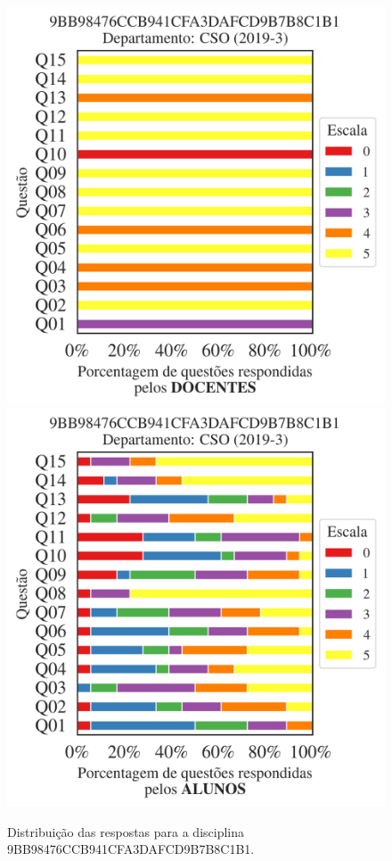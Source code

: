 \documentclass[a4paper,10pt]{article}
\begin{document}
\begin{figure}[h]
\centering
\includegraphics[width=0.485\linewidth]{analise_disciplina_departamento_CSO_9BB98476CCB941CFA3DAFCD9B7B8C1B1_docentes.png}
\includegraphics[width=0.485\linewidth]{analise_disciplina_departamento_CSO_9BB98476CCB941CFA3DAFCD9B7B8C1B1_alunos.png}
\caption{\label{fig:analise_geral_departamento}                Distribuição das respostas para a disciplina 9BB98476CCB941CFA3DAFCD9B7B8C1B1. }
\end{figure}
\end{document}
